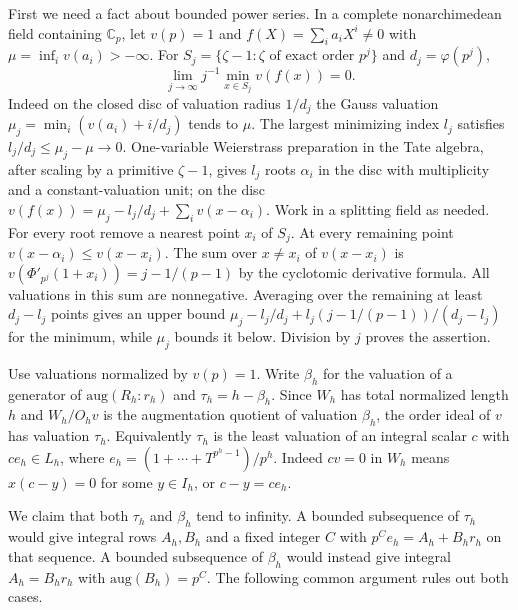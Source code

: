 \documentclass[11pt]{article}
\begin{document}
First we need a fact about bounded power series. In a complete
nonarchimedean field containing $\mathbb C_p$, let $v(p)=1$ and
$f(X)=\sum_i a_i X^i\ne0$ with $\mu=\inf_i v(a_i)>-\infty$.
For $S_j=\{\zeta-1:\zeta\text{ of exact order }p^j\}$ and
$d_j=\varphi(p^j)$,
\[
 \lim_{j\to\infty}j^{-1}\min_{x\in S_j}v(f(x))=0 .
\]
Indeed on the closed disc of valuation radius $1/d_j$ the Gauss valuation
$\mu_j=\min_i(v(a_i)+i/d_j)$ tends to $\mu$. The largest minimizing
index $l_j$ satisfies $l_j/d_j\le\mu_j-\mu\to0$. One-variable
Weierstrass preparation in the Tate algebra, after scaling by a primitive
$\zeta-1$, gives $l_j$ roots $\alpha_i$ in the disc with multiplicity and
a constant-valuation unit; on the disc
$v(f(x))=\mu_j-l_j/d_j+\sum_i v(x-\alpha_i)$.
Work in a splitting field as needed. For every root remove a nearest
point $x_i$ of $S_j$. At every remaining point
$v(x-\alpha_i)\le v(x-x_i)$. The sum over $x\ne x_i$ of $v(x-x_i)$ is
$v(\Phi'_{p^j}(1+x_i))=j-1/(p-1)$ by the cyclotomic derivative formula.
All valuations in this sum are nonnegative. Averaging over the remaining
at least $d_j-l_j$ points gives an upper bound
$\mu_j-l_j/d_j+l_j(j-1/(p-1))/(d_j-l_j)$ for the minimum, while
$\mu_j$ bounds it below. Division by $j$ proves the assertion.

Use valuations normalized by $v(p)=1$. Write $\beta_h$ for the
valuation of a generator of $\mathrm{aug}(R_h:r_h)$ and
$\tau_h=h-\beta_h$. Since $W_h$ has total normalized length $h$ and
$W_h/O_h v$ is the augmentation quotient of valuation $\beta_h$, the
order ideal of $v$ has valuation $\tau_h$. Equivalently $\tau_h$ is
the least valuation of an integral scalar $c$ with $c e_h\in L_h$,
where $e_h=(1+\cdots+T^{p^h-1})/p^h$. Indeed $c v=0$ in $W_h$ means
$x(c-y)=0$ for some $y\in I_h$, or $c-y=c e_h$.

We claim that both $\tau_h$ and $\beta_h$ tend to infinity.
A bounded subsequence of $\tau_h$ would give integral rows $A_h,B_h$
and a fixed integer $C$ with $p^C e_h=A_h+B_h r_h$ on that sequence.
A bounded subsequence of $\beta_h$ would instead give integral
$A_h=B_h r_h$ with $\mathrm{aug}(B_h)=p^C$. The following common
argument rules out both cases.
\end{document}
